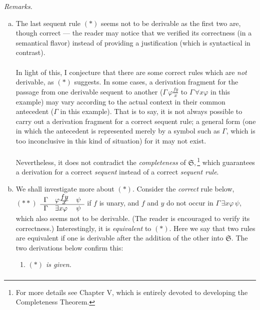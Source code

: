 \begin{enumerate}[1.]
\textit{Remarks.}
\begin{enumerate}[(a)]
\item The last sequent rule $(*)$ seems not to be derivable as the first two are, though correct --- the reader may notice that we verified its correctness (in a semantical flavor) instead of providing a justification (which is syntactical in contrast).\\
\ \\
In light of this, I conjecture that there are some correct rules which are \emph{not} derivable,  as $(*)$ suggests. In some cases, a derivation fragment for the passage from one derivable sequent to another ($\Gamma \, \varphi\frac{fy}{x}$ to $\Gamma \, \forall x \varphi$ in this example) may vary according to the actual context in their common antecedent ($\Gamma$ in this example). That is to say, it is not always possible to carry out a derivation fragment for a correct sequent rule; a general form (one in which the antecedent is represented merely by a symbol such as $\Gamma$, which is too inconclusive in this kind of situation) for it may not exist.\\
\ \\
Nevertheless, it does not contradict the \emph{completeness} of $\mathfrak{S},$\footnote{For more details see Chapter V, which is entirely devoted to developing the Completeness Theorem.} which guarantees a derivation for a correct \emph{sequent} instead of a correct \emph{sequent rule}.
\item
We shall investigate more about $(*)$. Consider the \emph{correct} rule below,\\ \newline
$(**)$ \hfill $\begin{array}{lll}
\Gamma & \varphi{\scriptstyle\frac{\displaystyle fy}{\displaystyle x}} & \psi \cr \hline
\Gamma & \exists x \varphi & \psi
\end{array}$ if $f$ is unary, and $f$ and $y$ do not occur in $\Gamma \, \exists x \varphi \, \psi$, \hfill \ \\ \newline
which also seems not to be derivable. (The reader is encouraged to verify its correctness.) Interestingly, it is \emph{equivalent} to $(*)$. Here we say that two rules are equivalent if one is derivable after the addition of the other into $\mathfrak{S}$. The two derivations below confirm this:
\begin{enumerate}[(1)]
\item \textit{$(*)$ is given.}
\[
\begin{array}{lllll}

\end{array}\]
\end{enumerate}
\end{enumerate}
\end{enumerate}

